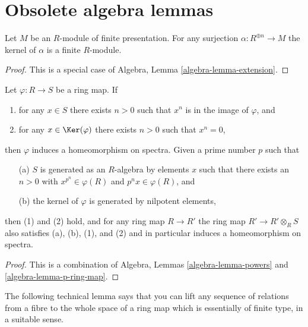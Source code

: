 \section{Obsolete algebra lemmas}
\label{section-algebra}

\begin{lemma}
\label{lemma-finite-presentation-module-independent}
Let $M$ be an $R$-module of finite presentation.
For any surjection $\alpha : R^{\oplus n} \to M$ the
kernel of $\alpha$ is a finite $R$-module.
\end{lemma}

\begin{proof}
This is a special case of Algebra, Lemma \ref{algebra-lemma-extension}.
\end{proof}

\begin{lemma}
\label{lemma-p-ring-map}
Let $\varphi : R \to S$ be a ring map. If
\begin{enumerate}
\item for any $x \in S$ there exists $n > 0$ such that
$x^n$ is in the image of $\varphi$, and
\item for any $x \in \Ker(\varphi)$ there exists $n > 0$
such that $x^n = 0$,
\end{enumerate}
then $\varphi$ induces a homeomorphism on spectra. Given a
prime number $p$ such that
\begin{enumerate}
\item[(a)] $S$ is generated as an $R$-algebra by elements $x$ such
that there exists an $n > 0$ with $x^{p^n} \in \varphi(R)$ and
$p^nx \in \varphi(R)$, and
\item[(b)] the kernel of $\varphi$ is generated by nilpotent elements,
\end{enumerate}
then (1) and (2) hold, and for any ring map $R \to R'$
the ring map $R' \to R' \otimes_R S$ also satisfies (a), (b), (1), and (2)
and in particular induces a homeomorphism on spectra.
\end{lemma}

\begin{proof}
This is a combination of
Algebra, Lemmas \ref{algebra-lemma-powers} and
\ref{algebra-lemma-p-ring-map}.
\end{proof}

\noindent
The following technical lemma says that you can lift any sequence
of relations from a fibre to the whole space of a ring
map which is essentially of finite type, in a suitable sense.

